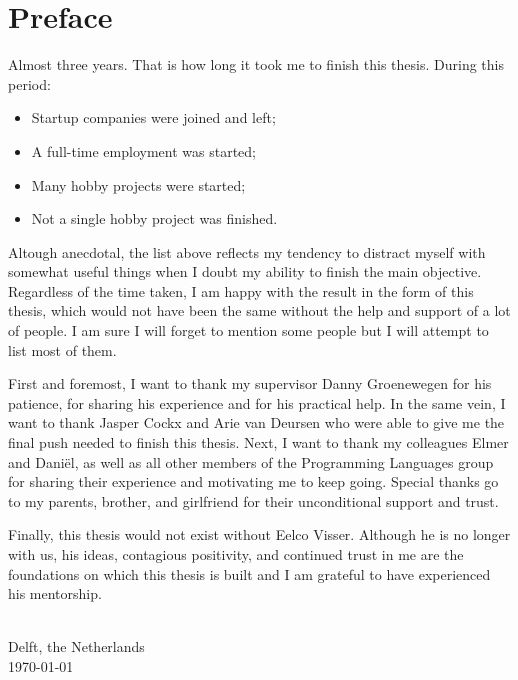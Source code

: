 
\chapter{\label{chap:Preface}Preface}

Almost three years. That is how long it took me to finish this thesis. During this period:

\begin{itemize}
 \item Startup companies were joined and left;
 \item A full-time employment was started;
 \item Many hobby projects were started;
 \item Not a single hobby project was finished.
\end{itemize}

Altough anecdotal, the list above reflects my tendency to distract myself with somewhat useful things when I doubt my ability to finish the main objective.
Regardless of the time taken, I am happy with the result in the form of this thesis, which would not have been the same without the help and support of a lot of people.
I am sure I will forget to mention some people but I will attempt to list most of them.

First and foremost, I want to thank my supervisor Danny Groenewegen for his patience, for sharing his experience and for his practical help.
In the same vein, I want to thank Jasper Cockx and Arie van Deursen who were able to give me the final push needed to finish this thesis.
Next, I want to thank my colleagues Elmer and Daniël, as well as all other members of the Programming Languages group for sharing their experience and motivating me to keep going.
Special thanks go to my parents, brother, and girlfriend for their unconditional support and trust.

Finally, this thesis would not exist without Eelco Visser.
Although he is no longer with us, his ideas, contagious positivity, and continued trust in me are the foundations on which this thesis is built
and I am grateful to have experienced his mentorship.

\vspace{1cm}
\begin{flushright}
\theauthor{}\\
Delft, the Netherlands\\
\today{}\\
\end{flushright}
